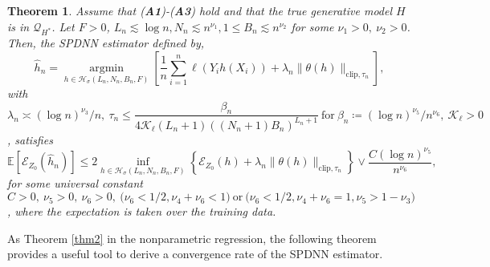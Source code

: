 \documentclass[10pt,twoside]{article}
\numberwithin{equation}{section}
\newtheorem{thm}{Theorem}[section]
\newcommand{\E}{\ensuremath{\mathbb{E}}}
\DeclareMathOperator*{\argmin}{argmin}
\begin{document}
\begin{thm}\label{thm3}
Assume that (\textbf{A1})-(\textbf{A3}) hold and that the true generative model $H$ is in $\mathcal{Q}_ {H^ {*}} $.
%
Let  $F > 0$, $L_n \lesssim \log n, N_n \lesssim n^{\nu_1},  1 \leq  B_n \lesssim n^{\nu_2} $ for some $\nu_1 >0, ~ \nu_2 > 0$.
%
Then, the SPDNN estimator defined by, 
\begin{equation}\label{def_SPDNN_class}
\widehat{h}_n = \underset{h \in \mathcal{H}_ {\sigma}(L_n, N_n, B_n, F) }{\argmin}\left[ \dfrac{1}{n} \sum_{i=1}^{n} \ell(Y_i h (X_i)) + \lambda_n \| \theta (h)\|_{\text{clip}, \tau_n}  \right],
\end{equation}
%
with $\lambda_n \asymp (\log n) ^{\nu_3} /n, ~ \tau_n \leq  \dfrac{\beta_n}{4 \mathcal{K}_ {\ell}  (L_n + 1)((N_n + 1) B_n) ^{L_n +1}} ~ 
\text{for} ~ \beta_n \coloneqq (\log n) ^{\nu_5} /n^ {\nu_6}, ~  \mathcal{K}_ {\ell} > 0$, satisfies
%
\begin{equation}
\E \left[ \mathcal{E}_{Z_0} (\widehat{h}_n)\right] \leq 2 \underset{h \in \mathcal{H}_ {\sigma}( L_n, N_n, B_n, F)}{\inf} \left\{ \mathcal{E}_{Z_0} (h) +  \lambda_n \|\theta (h)\|_{\text{clip}, \tau_n} \right\} \lor \dfrac{C (\log n) ^{\nu_5} }{ n^ {\nu_6}},
\end{equation}
%
for some  universal constant  $ C >0, ~ \nu_5 > 0, ~ \nu_6 > 0, ~ \Big( \nu_6 < 1/2, \nu_4 + \nu_6 < 1  \Big) ~ \text{or} ~ \Big( 
\nu_6 < 1/2, \nu_4 + \nu_6 = 1, \nu_5 > 1-\nu_3 \Big) $, where the expectation is taken over the training data.
 \end{thm}

%

As Theorem \ref{thm2} in the nonparametric regression, the following theorem provides a useful tool to derive a convergence rate of the SPDNN estimator.
% 
\end{document}
